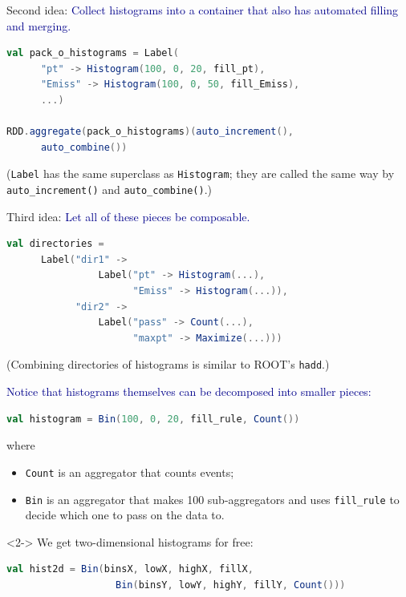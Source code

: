 \documentclass{beamer}
\begin{document}
\begin{frame}[fragile]{Second idea:}
\textcolor{darkblue}{\large Collect histograms into a container that also has automated filling and merging.}

\begin{lstlisting}[language=scala]
val pack_o_histograms = Label(
      "pt" -> Histogram(100, 0, 20, fill_pt),
      "Emiss" -> Histogram(100, 0, 50, fill_Emiss),
      ...)

RDD.aggregate(pack_o_histograms)(auto_increment(),
      auto_combine())
\end{lstlisting}

\vfill
({\tt \small Label} has the same superclass as {\tt \small Histogram}; they are called the same way by {\tt \small auto\_increment()} and {\tt \small auto\_combine()}.)
\end{frame}

\begin{frame}[fragile]{Third idea:}
\textcolor{darkblue}{\large Let all of these pieces be composable.}

\begin{lstlisting}[language=scala]
val directories =
      Label("dir1" ->
                Label("pt" -> Histogram(...),
                      "Emiss" -> Histogram(...)),
            "dir2" ->
                Label("pass" -> Count(...),
                      "maxpt" -> Maximize(...)))
\end{lstlisting}

\vspace{0.5 cm}
(Combining directories of histograms is similar to ROOT's {\tt \small hadd}.)
\end{frame}

\begin{frame}[fragile]{}
\textcolor{darkblue}{\large Notice that histograms themselves can be decomposed into smaller pieces:}

\begin{lstlisting}[language=scala]
val histogram = Bin(100, 0, 20, fill_rule, Count())
\end{lstlisting}

where
\begin{itemize}
\item {\tt \small Count} is an aggregator that counts events;
\item {\tt \small Bin} is an aggregator that makes 100 sub-aggregators and uses {\tt \small fill\_rule} to decide which one to pass on the data to.
\end{itemize}

\vfill
\begin{uncoverenv}<2->
We get two-dimensional histograms for free:
\begin{lstlisting}[language=scala]
val hist2d = Bin(binsX, lowX, highX, fillX,
                   Bin(binsY, lowY, highY, fillY, Count()))
\end{lstlisting}
\end{uncoverenv}
\vspace{-2 cm}
\end{frame}
\end{document}
